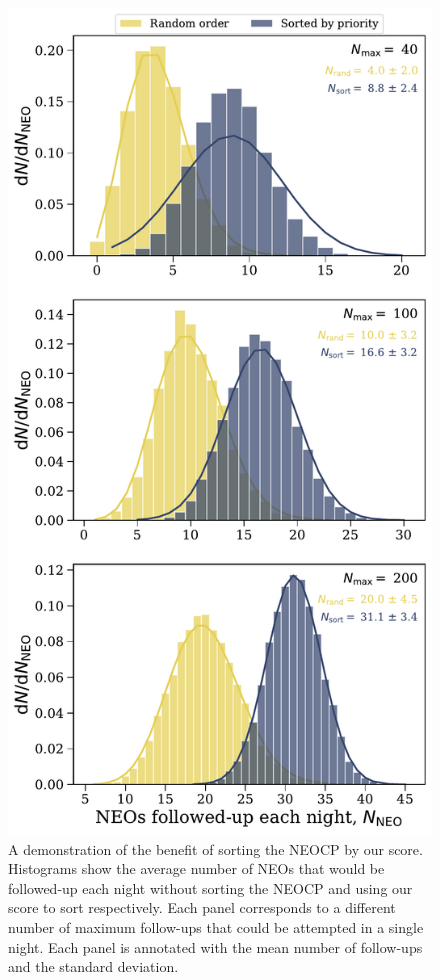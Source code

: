 \documentclass[twocolumn, twocolappendix]{aastex631}
\begin{document}
\begin{figure}[htb]
    \centering
    \includegraphics[width=\columnwidth]{sorting_benefits.pdf}
    \caption{A demonstration of the benefit of sorting the NEOCP by our score. Histograms show the average number of NEOs that would be followed-up each night without sorting the NEOCP and using our score to sort respectively. Each panel corresponds to a different number of maximum follow-ups that could be attempted in a single night. Each panel is annotated with the mean number of follow-ups and the standard deviation.}
    \label{fig:sort_by_score}
\end{figure}
\end{document}
